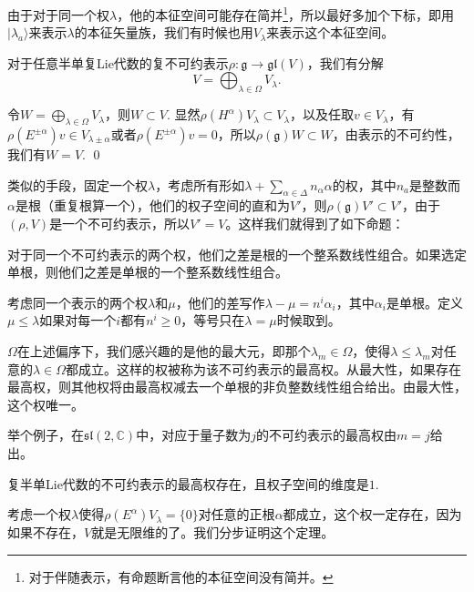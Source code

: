 \documentclass[9pt]{extarticle}
\newcommand{\cc}{\mathbb{C}}
\newcommand{\lag}{{\mathfrak{g}}}
\begin{document}
\para 由于对于同一个权$\lambda$，他的本征空间可能存在简并\footnote{对于伴随表示，有命题断言他的本征空间没有简并。}，所以最好多加个下标，即用$|\lambda_a\rangle$来表示$\lambda$的本征矢量族，我们有时候也用$V_{\lambda}$来表示这个本征空间。

\pro 对于任意半单复Lie代数的复不可约表示$\rho:\lag\to \mathfrak{gl}(V)$，我们有分解
\[
	V=\bigoplus_{\lambda\in\Omega} V_\lambda.
\]

\proof 令$W=\bigoplus_{\lambda\in\Omega} V_\lambda$，则$W\subset V$. 显然$\rho(H^\alpha)V_\lambda\subset V_\lambda$，以及任取$v\in V_\lambda$，有$\rho(E^{\pm\alpha})v \in V_{\lambda\pm\alpha}$或者$\rho(E^{\pm\alpha})v=0$，所以$\rho(\lag)W\subset W$，由表示的不可约性，我们有$W=V$. \qed

类似的手段，固定一个权$\lambda$，考虑所有形如$\lambda+\sum_{\alpha\in\Delta} n_\alpha\alpha$的权，其中$n_a$是整数而$\alpha$是根（重复根算一个），他们的权子空间的直和为$V'$，则$\rho(\lag)V'\subset V'$，由于$(\rho,V)$是一个不可约表示，所以$V'=V$。这样我们就得到了如下命题：

\pro 对于同一个不可约表示的两个权，他们之差是根的一个整系数线性组合。如果选定单根，则他们之差是单根的一个整系数线性组合。

\para 考虑同一个表示的两个权$\lambda$和$\mu$，他们的差写作$\lambda-\mu=n^i \alpha_i$，其中$\alpha_i$是单根。定义$\mu \leq \lambda$如果对每一个$i$都有$n^i\geq 0$，等号只在$\lambda=\mu$时候取到。

$\Omega$在上述偏序下，我们感兴趣的是他的最大元，即那个$\lambda_m\in \Omega$，使得$\lambda\leq \lambda_m$对任意的$\lambda\in \Omega$都成立。这样的权被称为该不可约表示的最高权。从最大性，如果存在最高权，则其他权将由最高权减去一个单根的非负整数线性组合给出。由最大性，这个权唯一。

举个例子，在$\mathfrak{sl}(2,\cc)$中，对应于量子数为$j$的不可约表示的最高权由$m=j$给出。

\theo 复半单Lie代数的不可约表示的最高权存在，且权子空间的维度是$1$.

\proof 考虑一个权$\lambda$使得$\rho(E^\alpha)V_\lambda=\{0\}$对任意的正根$\alpha$都成立，这个权一定存在，因为如果不存在，$V$就是无限维的了。我们分步证明这个定理。
\end{document}
